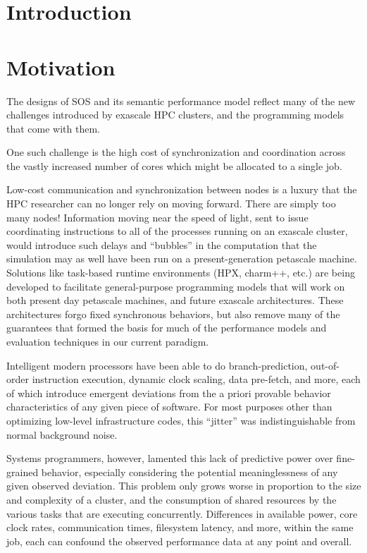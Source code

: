
\section{Introduction}


\section{Motivation}

The designs of SOS and its semantic performance model reflect many of
the new challenges introduced by exascale HPC clusters, and the
programming models that come with them.

One such challenge is the high cost of synchronization and
coordination across the vastly increased number of cores which might
be allocated to a single job.

Low-cost communication and synchronization between nodes is a luxury
that the HPC researcher can no longer rely on moving forward. There
are simply too many nodes! Information moving near the speed of light,
sent to issue coordinating instructions to all of the processes
running on an exascale cluster, would introduce such delays and
``bubbles'' in the computation that the simulation may as well have
been run on a present-generation petascale
machine.  Solutions like task-based runtime
environments (HPX, charm++, etc.)  are being developed to facilitate
general-purpose programming models that will work on both present day
petascale machines, and future exascale architectures. These
architectures forgo fixed synchronous behaviors, but also remove many
of the guarantees that formed the basis for much of the performance
models and evaluation techniques in our current paradigm.

Intelligent modern processors have been able to do branch-prediction,
out-of-order instruction execution, dynamic clock scaling, data
pre-fetch, and more, each of which introduce emergent deviations from
the a priori provable behavior characteristics of any given piece of
software. For most purposes other than optimizing low-level
infrastructure codes, this ``jitter'' was indistinguishable from
normal background noise.

Systems programmers, however, lamented this lack of predictive power
over fine-grained behavior, especially considering the potential
meaninglessness of any given observed
deviation.   This
problem only grows worse in proportion to the size and complexity of
a cluster, and the consumption of shared resources by the various tasks
that are executing concurrently.  Differences in available power, core
clock rates, communication times, filesystem latency, and more, within
the same job, each can confound the observed performance data at any
point and overall.

